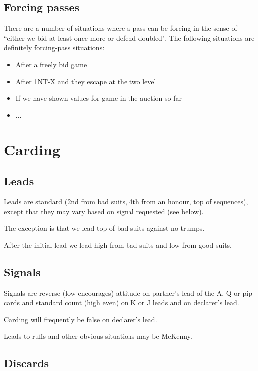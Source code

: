 \documentclass[a4paper,14pt]{extarticle}
\begin{document}
\subsection{Forcing passes}
\label{sec:forcepass}

There are a number of situations where a pass can be forcing in the sense of
``either we bid at least once more or defend doubled". The following situations
are definitely forcing-pass situations:

\begin{itemize}
\item After a freely bid game
\item After 1NT-X and they escape at the two level
\item If we have shown values for game in the auction so far
\item ...
\end{itemize}

\newpage

\section{Carding}
\label{sec:carding}

\subsection{Leads}
\label{sec:card:leads}

Leads are standard (2nd from bad suits, 4th from an honour, top of sequences),
except that they may vary based on signal requested (see below).

The exception is that we lead top of bad suits against no trumps.

After the initial lead we lead high from bad suits and low from good suits.

\subsection{Signals}
\label{sec:card:signals}

Signals are reverse (low encourages) attitude on partner's lead of the A, Q or
pip cards and standard count (high even) on K or J leads and on declarer's
lead.

Carding will frequently be false on declarer's lead.

Leads to ruffs and other obvious situations may be McKenny.

\subsection{Discards}
\label{sec:card:discards}
\end{document}
